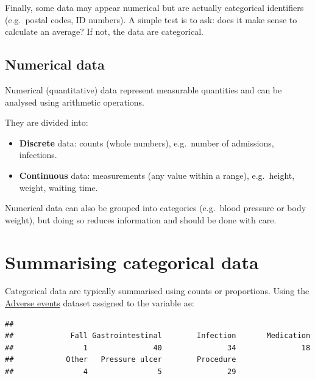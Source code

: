 \documentclass[
]{book}
\newenvironment{Shaded}{\begin{snugshade}}{\end{snugshade}}
\newcommand{\CommentTok}[1]{\textcolor[rgb]{0.56,0.35,0.01}{\textit{#1}}}
\newcommand{\FunctionTok}[1]{\textcolor[rgb]{0.13,0.29,0.53}{\textbf{#1}}}
\newcommand{\NormalTok}[1]{#1}
\newcommand{\OtherTok}[1]{\textcolor[rgb]{0.56,0.35,0.01}{#1}}
\newcommand{\SpecialCharTok}[1]{\textcolor[rgb]{0.81,0.36,0.00}{\textbf{#1}}}
\providecommand{\tightlist}{%
  \setlength{\itemsep}{0pt}\setlength{\parskip}{0pt}}
\begin{document}
Finally, some data may appear numerical but are actually categorical
identifiers (e.g.~postal codes, ID numbers). A simple test is to ask:
does it make sense to calculate an average? If not, the data are
categorical.

\subsection{Numerical data}\label{numerical-data}

Numerical (quantitative) data represent measurable quantities and can be
analysed using arithmetic operations.

They are divided into:

\begin{itemize}
\tightlist
\item
  \textbf{Discrete} data: counts (whole numbers), e.g.~number of
  admissions, infections.
\item
  \textbf{Continuous} data: measurements (any value within a range),
  e.g.~height, weight, waiting time.
\end{itemize}

Numerical data can also be grouped into categories (e.g.~blood pressure
or body weight), but doing so reduces information and should be done
with care.

\section{Summarising categorical
data}\label{summarising-categorical-data}

Categorical data are typically summarised using counts or proportions.
Using the \hyperref[adverse-events]{Adverse events} dataset assigned to
the variable ae:

\begin{Shaded}
\end{Shaded}

\begin{verbatim}
## 
##             Fall Gastrointestinal        Infection       Medication 
##                1               40               34               18 
##            Other   Pressure ulcer        Procedure 
##                4                5               29
\end{verbatim}
\end{document}
